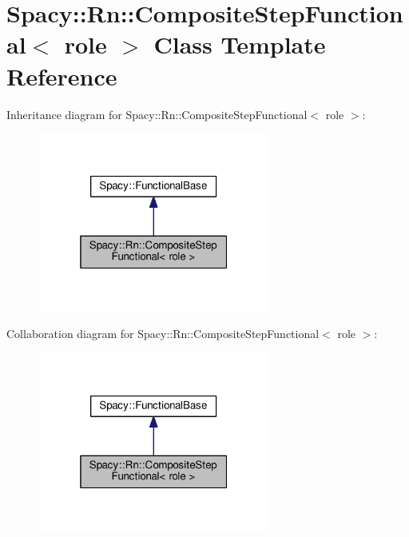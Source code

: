 \hypertarget{classSpacy_1_1Rn_1_1CompositeStepFunctional}{}\section{Spacy\+:\+:Rn\+:\+:Composite\+Step\+Functional$<$ role $>$ Class Template Reference}
\label{classSpacy_1_1Rn_1_1CompositeStepFunctional}


Inheritance diagram for Spacy\+:\+:Rn\+:\+:Composite\+Step\+Functional$<$ role $>$\+:
\nopagebreak
\begin{figure}[H]
\begin{center}
\leavevmode
\includegraphics[width=217pt]{classSpacy_1_1Rn_1_1CompositeStepFunctional__inherit__graph}
\end{center}
\end{figure}


Collaboration diagram for Spacy\+:\+:Rn\+:\+:Composite\+Step\+Functional$<$ role $>$\+:
\nopagebreak
\begin{figure}[H]
\begin{center}
\leavevmode
\includegraphics[width=217pt]{classSpacy_1_1Rn_1_1CompositeStepFunctional__coll__graph}
\end{center}
\end{figure}

